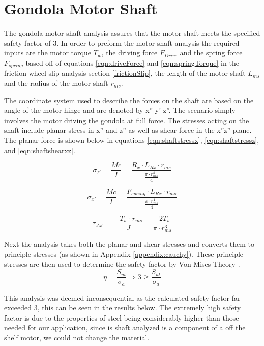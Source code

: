 \documentclass[../main.tex]{subfiles}
\begin{document}
\section{Gondola Motor Shaft} \label{motorShaft}
The gondola motor shaft analysis assures that the motor shaft meets the specified safety factor of 3. In order to preform the motor shaft analysis the required inputs are the motor torque $T_w$, the driving force $F_{Drive}$ and the spring force $F_{spring}$ based off of equations \ref{eqn:driveForce} and \ref{eqn:springTorque} in the friction wheel slip analysis section \ref{frictionSlip}, the length of the motor shaft $L_{ms}$ and the radius of the motor shaft $r_{ms}$.

The coordinate system used to describe the forces on the shaft are based on the angle of the motor hinge and are denoted by  x'' y' z''. The scenario simply involves the motor driving the gondola at full force. The stresses acting on the shaft include planar stress in x'' and z'' as well as shear force in the x''z'' plane. The planar force is shown below in equations  \ref{eqn:shaftstressx}, \ref{eqn:shaftstressz}, and \ref{eqn:shaftshearxz}.

\begin{equation} \label{eqn:shaftstressz}
\sigma_{z'}=\frac{Mc}{I}=\frac{R_{x}\cdot{}L_{Rx}\cdot{}r_{ms}}{\frac{\pi\cdot{}r_{ms}^4}{4}}
\end{equation}

\begin{equation} 
\label{eqn:shaftstressx}
\sigma_{x'}=\frac{Mc}{I}=\frac{F_{spring}\cdot{}L_{Rx}\cdot{}r_{ms}}{\frac{\pi\cdot{}r_{ms}^4}{4}}
\end{equation}

\begin{equation}
\label{eqn:shaftshearxz}
\tau_{z'x'} = \frac{-T_w\cdot{}r_{ms}}{J} = \frac{-2T_w}{\pi\cdot{}r_{ms}^3}
\end{equation}

Next the analysis takes both the planar and shear stresses and converts them to principle stresses (as shown in Appendix \ref{appendix:cauchy}). These principle stresses are then used to determine the safety factor by Von Mises Theory \cite[221]{shigley}. 
\begin{equation}
\eta = \dfrac{S_{ut}}{\sigma _a} \Rightarrow 3 \geq \dfrac{S_{ut}}{\sigma _a}
\end{equation}

This analysis was deemed inconsequential as the calculated safety factor far exceeded 3, this can be seen in the results below. The extremely high safety factor is due to the properties of steel being considerably higher than those needed for our application, since is shaft analyzed is a component of a off the shelf motor, we could not change the material. 
\end{document}
